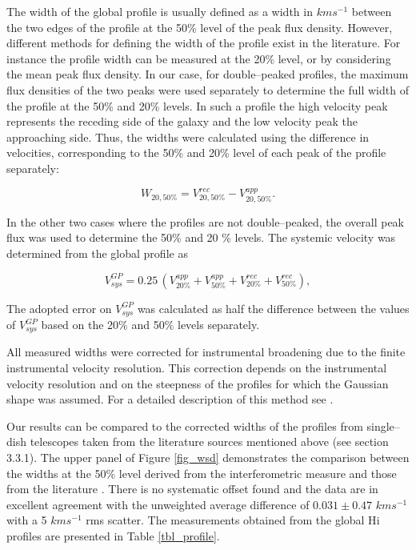 \documentclass[usenatbib,useAMS]{mnras}
\begin{document}
The width of the global profile is usually defined as a width in $km
s^{-1}$ between the two edges of the profile at the 50\% level of the
peak flux density.  However, different methods for defining the width of
the profile exist in the literature.  For instance the profile width can
be measured at the 20\% level, or by considering the mean peak flux
density.  In our case, for double--peaked profiles, the maximum flux
densities of the two peaks were used separately to determine the full
width of the profile at the 50\% and 20\% levels.  In such a profile the
high velocity peak represents the receding side of the galaxy and the
low velocity peak the approaching side.  Thus, the widths were
calculated using the difference in velocities, corresponding to the 50\%
and 20\% level of each peak of the profile separately:

\begin{equation}
W_{20,50\%} = V_{20,50\%}^{rec} - V_{20,50\%}^{app}. 
\end{equation}

In the other two cases where the profiles are not double--peaked, the
overall peak flux was used to determine the 50\% and 20 \% levels.  The
systemic velocity was determined from the global profile as

\begin{equation}
V_{sys}^{GP} = 0.25\,(V_{20\%}^{app}+V_{50\%}^{app}+V_{20\%}^{rec}+V_{50\%}^{rec}), 
\end{equation}

The adopted error on $V_{sys}^{GP}$ was calculated as half the
difference between the values of $V_{sys}^{GP}$ based on the 20\% and
50\% levels separately. 

All measured widths were corrected for instrumental broadening due to
the finite instrumental velocity resolution. This correction
depends on the instrumental velocity resolution and on the steepness of
the profiles for which the Gaussian shape was assumed.  For a detailed
description of this method see \citet{versanc01}.

Our results can be compared to the corrected widths of the profiles from
single--dish telescopes taken from the literature sources mentioned
above (see section 3.3.1).  The upper panel of Figure \ref{fig_wsd}
demonstrates the comparison between the widths at the 50\% level derived
from the interferometric measure and those from the literature
\citep{ksk04, shg05, ctf09, ctf10, hgm11}.  There is no systematic
offset found and the data are in excellent agreement with the unweighted
average difference of $0.031 \pm 0.47$ $kms^{-1}$ with a 5 $kms^{-1}$
rms scatter.  The measurements obtained from the global H{\sc i}
profiles are presented in Table \ref{tbl_profile}. 
\end{document}

